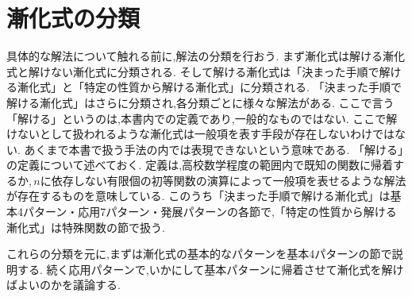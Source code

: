 
\section{漸化式の分類}
  具体的な解法について触れる前に,解法の分類を行おう.
  まず漸化式は解ける漸化式と解けない漸化式に分類される.
  そして解ける漸化式は「決まった手順で解ける漸化式」と「特定の性質から解ける漸化式」に分類される.
  「決まった手順で解ける漸化式」はさらに分類され,各分類ごとに様々な解法がある.
  ここで言う「解ける」というのは,本書内での定義であり,一般的なものではない.
  ここで解けないとして扱われるような漸化式は一般項を表す手段が存在しないわけではない.
  あくまで本書で扱う手法の内では表現できないという意味である.
  「解ける」の定義について述べておく.
  定義は,高校数学程度の範囲内で既知の関数に帰着するか,\,$n$に依存しない有限個の初等関数の演算によって一般項を表せるような解法が存在するものを意味している.
  このうち「決まった手順で解ける漸化式」は基本4パターン・応用7パターン・発展パターンの各節で,「特定の性質から解ける漸化式」は特殊関数の節で扱う.

  これらの分類を元に,まずは漸化式の基本的なパターンを基本4パターンの節で説明する.
  続く応用パターンで,いかにして基本パターンに帰着させて漸化式を解けばよいのかを議論する.

